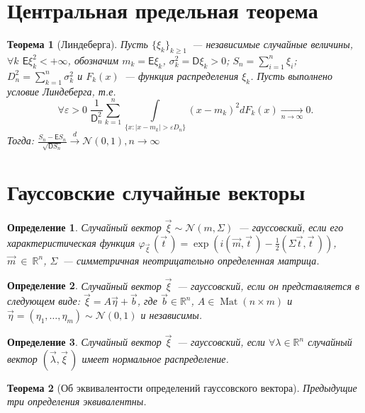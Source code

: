 \documentclass[11pt]{article}
\newtheorem{thm}{Теорема}[section]
\newtheorem{definition}{Определение}
\newcommand{\E}{\mathsf{E}}
\newcommand{\D}{\mathsf{D}}
\newcommand{\N}{\mathcal{N}}
\newcommand{\R}{\mathbb{R}}
\DeclareMathOperator{\Mat}{Mat}
\begin{document}
	\section{Центральная предельная теорема}
	\begin{thm}[Линдеберга]
		Пусть $\{\xi_k\}_{k \geq 1}$~--- независимые случайные величины,
		$\forall k$ $\E\xi_k^2 < +\infty$, обозначим $m_k = \E\xi_k$, $\sigma_k^2 = \D\xi_k > 0$; 
		$S_n = \sum\limits_{i=1}^n \xi_i$; $D_n^2 = \sum\limits_{k=1}^n \sigma_k^2$ и $F_k(x)$~--- 					функция распределения $\xi_k$. Пусть выполнено условие Линдеберга, т.е.
		\[
			\forall\varepsilon > 0\;\frac{1}{\D_n^2}\sum\limits_{k=1}^n\int\limits_{\{x : |x - m_k| > 					\varepsilon D_n\}}(x - m_k)^2 dF_k(x)\underset{n\rightarrow\infty}{\longrightarrow}0.			
		\]  
		Тогда: $\frac{S_n - \E S_n}{\sqrt{\D S_n}}\overset{d}{\rightarrow}\N(0,1), n\rightarrow \infty$	
	\end{thm}
	\section{Гауссовские случайные векторы}
	\begin{definition}
		Случайный вектор $\vec\xi\sim\N(m, \Sigma)$~--- гауссовский, если его характеристическая функция 
		$\varphi_{\vec\xi\,}(\vec t\,) = \exp \left(i(\vec m, \vec t\,) - \frac{1}{2}(\Sigma\vec t, 
		\vec t\,)\right)$, $\vec m~\in~\R^n$, $\Sigma$~--- симметричная неотрицательно определенная
		матрица.
	\end{definition}	
	\begin{definition}
		Случайный вектор $\vec\xi$~--- гауссовский, если он представляется в следующем виде: 
		$\vec\xi = A\vec\eta + \vec b$, где $\vec b \in \R^n$, $A \in \Mat (n\times m)$ и $\vec\eta = 
		(\eta_1, \dots, \eta_m)\sim\N(0,1)$ и независимы.
	\end{definition}
	\begin{definition}
		Случайный вектор $\vec\xi$~--- гауссовский, если $\forall\lambda\in\R^n$ случайный вектор
		$(\vec\lambda,\vec\xi\,)$ имеет нормальное распределение.
	\end{definition}
	\begin{thm}[Об эквивалентости определений гауссовского вектора]
		Предыдущие три определения эквивалентны.
	\end{thm}
\end{document}
